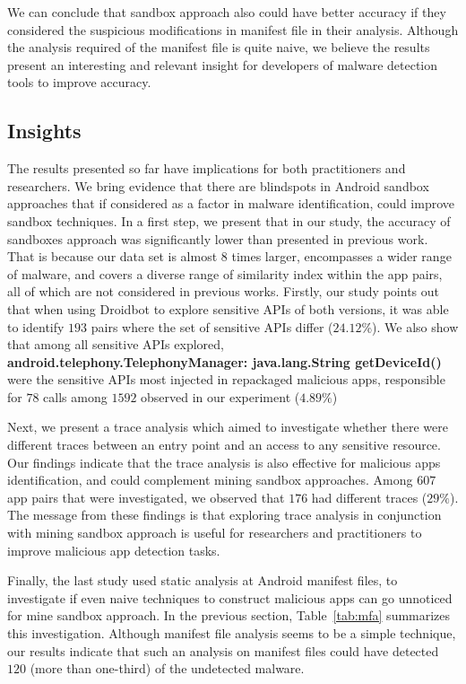 \begin{obs}{3}{}
 We can conclude that sandbox approach also could have better accuracy if they considered the suspicious modifications in manifest file in their analysis. Although the analysis required of the manifest file is quite naive, we believe the results present an interesting and relevant insight for developers of malware detection tools to improve accuracy.
\end{obs}

\subsection{Insights}\label{sec:implications} 

The results presented so far have implications for both practitioners and researchers. We bring evidence that there are blindspots in Android sandbox approaches that if considered as a factor in malware identification, could improve sandbox techniques. In a first step, we present that in our study, the accuracy of sandboxes approach was significantly lower than presented in previous work. That is because our data set is almost $8$ times larger, encompasses a wider range of malware, and covers a diverse range of similarity index within the app pairs, all of which are not considered in previous works. Firstly, our study points out that when using Droidbot to explore sensitive APIs of both versions, it was able to identify $193$ pairs where the set of sensitive APIs differ ($24.12$\%). We also show that among all sensitive APIs explored, \textbf{android.telephony.TelephonyManager: java.lang.String getDeviceId()} were the sensitive APIs most injected in repackaged malicious apps, responsible for $78$ calls among $1592$ observed in our experiment ($4.89\%$)

Next, we present a trace analysis which aimed to investigate whether there were different traces between an entry point and an access to any sensitive resource. Our findings indicate that the trace analysis is also effective for malicious apps identification, and could complement mining sandbox approaches. Among $607$ app pairs that were investigated, we observed that $176$ had different traces ($29\%$). The message from these findings is that exploring trace analysis in conjunction with mining sandbox approach is useful for researchers and practitioners to improve malicious app detection tasks. 

Finally, the last study used static analysis at Android manifest files, to investigate if even naive techniques to construct malicious apps can go unnoticed for mine sandbox approach. In the previous section, Table~\ref{tab:mfa} summarizes this investigation. Although manifest file analysis seems to be a simple technique, our results indicate that such an analysis on manifest files could have detected $120$ (more than one-third) of the undetected malware.

